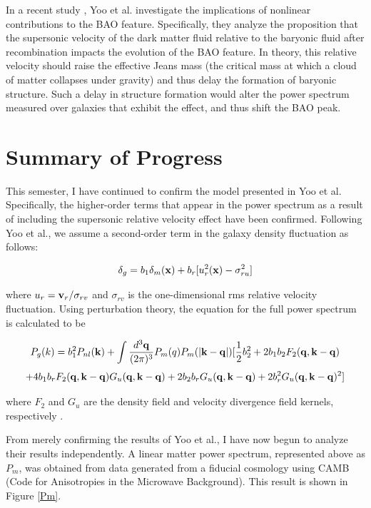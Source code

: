 \documentclass[12pt]{article}
\begin{document}
In a recent study \cite{Yooetal}, Yoo et al. investigate the implications of nonlinear contributions to the BAO feature. Specifically, they analyze the proposition that the supersonic velocity of the dark matter fluid relative to the baryonic fluid after recombination impacts the evolution of the BAO feature. In theory, this relative velocity should raise the effective Jeans mass (the critical mass at which a cloud of matter collapses under gravity) and thus delay the formation of baryonic structure. Such a delay in structure formation would alter the power spectrum measured over galaxies that exhibit the effect, and thus shift the BAO peak.

\section{Summary of Progress}

This semester, I have continued to confirm the model presented in Yoo et al. Specifically, the higher-order terms that appear in the power spectrum as a result of including the supersonic relative velocity effect have been confirmed. Following Yoo et al., we assume a second-order term in the galaxy density fluctuation as follows:

$$\delta_{g}=b_{1}\delta_{m}({\bf x})+b_{r}[u_{r}^{2}({\bf x})-\sigma_{ru}^{2}]$$

where $u_{r} ={\bf v}_{r}/\sigma_{rv}$ and $\sigma_{rv}$ is the one-dimensional rms relative velocity fluctuation. Using perturbation theory, the equation for the full power spectrum is calculated to be 

$$P_{g}(k) = b_{1}^{2}P_{nl}({\bf k}) + \int\frac{d^{3}\bf q}{(2\pi)^{3}}P_{m}(q)P_{m}(|{\bf k - q}|)[\frac{1}{2}b_{2}^{2}+2b_{1}b_{2}F_{2}({\bf q, k- q})$$
$$+4b_{1}b_{r}F_{2}({\bf q, k- q})G_{u}({\bf q, k- q})+2b_{2}b_{r}G_{u}({\bf q, k- q})+2b_{r}^{2}G_{u}({\bf q, k- q})^{2}]$$

where $F_{2}$ and $G_{u}$ are the density field and velocity divergence field kernels, respectively \cite{Yooetal} \cite{Bernardeau}.

From merely confirming the results of Yoo et al., I have now begun to analyze their results independently. A linear matter power spectrum, represented above as $P_{m}$, was obtained from data generated from a fiducial cosmology using CAMB (Code for Anisotropies in the Microwave Background). This result is shown in Figure \ref{Pm}.
\end{document}
